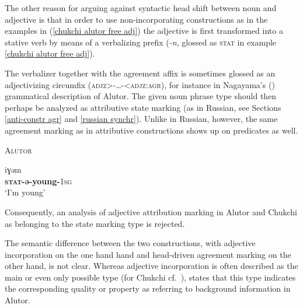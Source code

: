 The other reason for arguing against syntactic head shift between noun and adjective is that in order to use non-incorporating constructions as in the examples in (\ref{chukchi alutor free adj}) the adjective is first transformed into a stative verb by means of a verbalizing prefix (\textit{-n}, glossed as \textsc{stat} in example \ref{chukchi alutor free adj}).

The verbalizer together with the agreement affix is sometimes glossed as an adjectivizing circumfix (\textsc{adjz>-\dots-<adjz:agr}), for instance in Nagayama's (\citeyear{nagayama2003}) grammatical description of Alutor. The given noun phrase type should then perhaps be analyzed as attributive state marking (as in Russian, see Sections \ref{anti-constr agr} and \ref{russian synchr}). Unlike in Russian, however, the same agreement marking as in attributive constructions shows up on predicates as well.
\begin{exe}
\ex \textsc{Alutor} \citep{nagayama2003}
\begin{xlist}
\ex
{}iɣəm\\
	\textbf{\textsc{stat}-ə-young-}\textsc{1sg}\\
\glt	‘I'm young’
\end{xlist}
\end{exe}
Consequently, an analysis of adjective attribution marking in Alutor and Chuk\-chi as belonging to the state marking type is rejected.

The semantic difference between the two constructions, with adjective incorporation on the one hand hand and head-driven agreement marking on the other hand, is not clear. Whereas adjective incorporation is often described as the main or even only possible type (for Chukchi cf.~\citealt[37, 101]{kampfe-etal1995}), \citet[288]{kibrik-etal2000} states that this type indicates the corresponding quality or property as referring to background information in Alutor.

